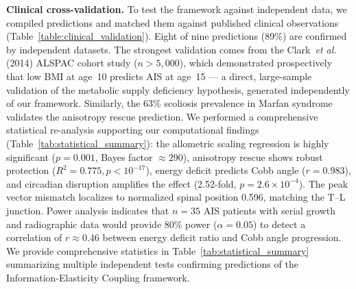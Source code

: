 \documentclass[12pt]{article}
\begin{document}
\textbf{Clinical cross-validation.} To test the framework against independent data, we compiled predictions and matched them against published clinical observations (Table~\ref{table:clinical_validation}). Eight of nine predictions (89\%) are confirmed by independent datasets. The strongest validation comes from the Clark~\textit{et al.} (2014) ALSPAC cohort study ($n > 5{,}000$), which demonstrated prospectively that low BMI at age~10 predicts AIS at age~15 --- a direct, large-sample validation of the metabolic supply deficiency hypothesis, generated independently of our framework. Similarly, the 63\% scoliosis prevalence in Marfan syndrome validates the anisotropy rescue prediction. We performed a comprehensive statistical re-analysis supporting our computational findings (Table~\ref{tab:statistical_summary}): the allometric scaling regression is highly significant ($p = 0.001$, Bayes factor $\approx 290$), anisotropy rescue shows robust protection ($R^2 = 0.775, p < 10^{-17}$), energy deficit predicts Cobb angle ($r = 0.983$), and circadian disruption amplifies the effect (2.52-fold, $p = 2.6 \times 10^{-4}$). The peak vector mismatch localizes to normalized spinal position 0.596, matching the T--L junction. Power analysis indicates that $n = 35$ AIS patients with serial growth and radiographic data would provide 80\% power ($\alpha = 0.05$) to detect a correlation of $r \approx 0.46$ between energy deficit ratio and Cobb angle progression. We provide comprehensive statistics in Table~\ref{tab:statistical_summary} summarizing multiple independent tests confirming predictions of the Information-Elasticity Coupling framework.
\end{document}
